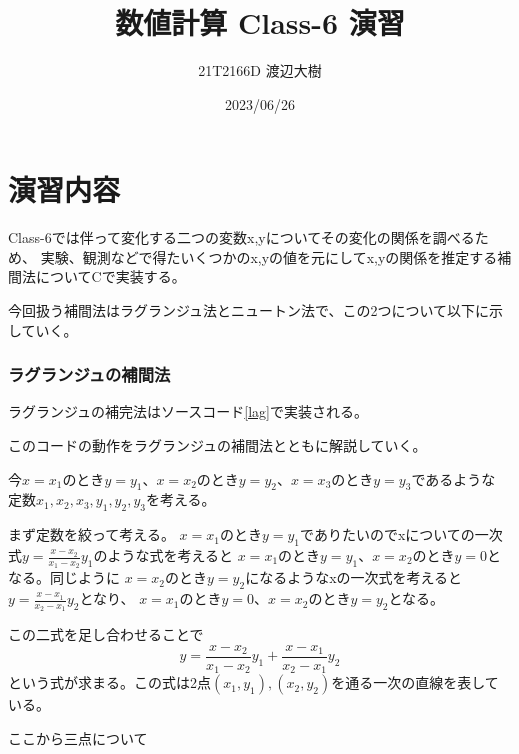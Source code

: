 \documentclass[a4paper,11pt,dvipdfmx]{jsarticle}
\begin{document}
\title{数値計算 Class-6 演習}
\author{21T2166D 渡辺大樹}
\date{2023/06/26}
\maketitle

\section{演習内容}
Class-6では伴って変化する二つの変数x,yについてその変化の関係を調べるため、
実験、観測などで得たいくつかのx,yの値を元にしてx,yの関係を推定する補間法についてCで実装する。

今回扱う補間法はラグランジュ法とニュートン法で、この2つについて以下に示していく。
\subsubsection{ラグランジュの補間法}
ラグランジュの補完法はソースコード\ref{lag}で実装される。


このコードの動作をラグランジュの補間法とともに解説していく。

今$x=x_1$のとき$y=y_1$、$x=x_2$のとき$y=y_2$、$x=x_3$のとき$y=y_3$であるような
定数$x_1,x_2,x_3,y_1,y_2,y_3$を考える。

まず定数を絞って考える。
$x=x_1$のとき$y=y_1$でありたいのでxについての一次式$y=\frac{x-x_2}{x_1-x_2}y_1$のような式を考えると
$x=x_1$のとき$y=y_1$、$x=x_2$のとき$y=0$となる。同じように
$x=x_2$のとき$y=y_2$になるようなxの一次式を考えると$y=\frac{x-x_1}{x_2-x_1}y_2$となり、
$x=x_1$のとき$y=0$、$x=x_2$のとき$y=y_2$となる。

この二式を足し合わせることで
\begin{equation*}
    y=\frac{x-x_2}{x_1-x_2}y_1 + \frac{x-x_1}{x_2-x_1}y_2
\end{equation*}
という式が求まる。この式は2点$(x_1,y_1),(x_2,y_2)$を通る一次の直線を表している。

ここから三点について
\end{document}
